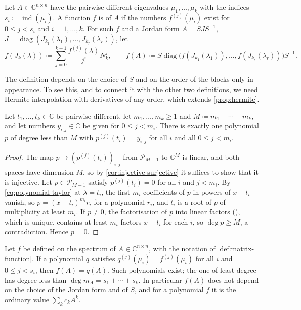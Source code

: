 \begin{definition}
\label{def:matrix-function}
Let $A\in\mathbb C^{n\times n}$ have the pairwise different eigenvalues $\mu_1,\ldots,\mu_k$ with the indices $s_i\coloneqq\operatorname{ind}(\mu_i)$. A function $f$ is  of $A$ if the numbers $f^{(j)}(\mu_i)$ exist for $0\le j<s_i$ and $i=1,\ldots,k$. For such $f$ and a Jordan form $A=SJS^{-1}$, $J=\operatorname{diag}(J_{k_1}(\lambda_1),\ldots,J_{k_r}(\lambda_r))$, let
\[
f(J_k(\lambda))\coloneqq\sum_{j=0}^{k-1}\frac{f^{(j)}(\lambda)}{j!}N_k^j,\qquad f(A)\coloneqq S\operatorname{diag}\bigl(f(J_{k_1}(\lambda_1)),\ldots,f(J_{k_r}(\lambda_r))\bigr)S^{-1}.
\]
\end{definition}

The definition depends on the choice of $S$ and on the order of the blocks only in appearance. To see this, and to connect it with the other two definitions, we need Hermite interpolation with derivatives of any order, which extends \cref{prop:hermite}.

\begin{proposition}
\label{prop:hermite-general}
Let $t_1,\ldots,t_k\in\mathbb C$ be pairwise different, let $m_1,\ldots,m_k\ge1$ and $M\coloneqq m_1+\cdots+m_k$, and let numbers $y_{i,j}\in\mathbb C$ be given for $0\le j<m_i$. There is exactly one polynomial $p$ of degree less than $M$ with $p^{(j)}(t_i)=y_{i,j}$ for all $i$ and all $0\le j<m_i$.
\end{proposition}

\begin{proof}
The map $p\mapsto(p^{(j)}(t_i))_{i,j}$ from $\mathcal P_{M-1}$ to $\mathbb C^M$ is linear, and both spaces have dimension $M$, so by \cref{cor:injective-surjective} it suffices to show that it is injective. Let $p\in\mathcal P_{M-1}$ satisfy $p^{(j)}(t_i)=0$ for all $i$ and $j<m_i$. By \eqref{eq:polynomial-taylor} at $\lambda=t_i$, the first $m_i$ coefficients of $p$ in powers of $x-t_i$ vanish, so $p=(x-t_i)^{m_i}r_i$ for a polynomial $r_i$, and $t_i$ is a root of $p$ of multiplicity at least $m_i$. If $p\ne0$, the factorisation of $p$ into linear factors (), which is unique, contains at least $m_i$ factors $x-t_i$ for each $i$, so $\deg p\ge M$, a contradiction. Hence $p=0$.
\end{proof}

\begin{theorem}
\label{thm:function-polynomial}
Let $f$ be defined on the spectrum of $A\in\mathbb C^{n\times n}$, with the notation of \cref{def:matrix-function}. If a polynomial $q$ satisfies $q^{(j)}(\mu_i)=f^{(j)}(\mu_i)$ for all $i$ and $0\le j<s_i$, then $f(A)=q(A)$. Such polynomials exist; the one of least degree has degree less than $\deg m_A=s_1+\cdots+s_k$. In particular $f(A)$ does not depend on the choice of the Jordan form and of $S$, and for a polynomial $f$ it is the ordinary value $\sum_kc_kA^k$.
\end{theorem}

